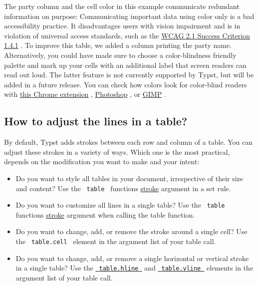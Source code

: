 The party column and the cell color in this example communicate
redundant information on purpose: Communicating important data using
color only is a bad accessibility practice. It disadvantages users with
vision impairment and is in violation of universal access standards,
such as the
\href{https://www.w3.org/WAI/WCAG21/Understanding/use-of-color.html}{WCAG
2.1 Success Criterion 1.4.1} . To improve this table, we added a column
printing the party name. Alternatively, you could have made sure to
choose a color-blindness friendly palette and mark up your cells with an
additional label that screen readers can read out loud. The latter
feature is not currently supported by Typst, but will be added in a
future release. You can check how colors look for color-blind readers
with
\href{https://chromewebstore.google.com/detail/colorblindly/floniaahmccleoclneebhhmnjgdfijgg}{this
Chrome extension} ,
\href{https://helpx.adobe.com/photoshop/using/proofing-colors.html}{Photoshop}
, or
\href{https://docs.gimp.org/2.10/en/gimp-display-filter-dialog.html}{GIMP}
.

\subsection{How to adjust the lines in a table?}\label{strokes}

By default, Typst adds strokes between each row and column of a table.
You can adjust these strokes in a variety of ways. Which one is the most
practical, depends on the modification you want to make and your intent:

\begin{itemize}
\tightlist
\item
  Do you want to style all tables in your document, irrespective of
  their size and content? Use the \texttt{\ table\ }
  function\textquotesingle s
  \href{/docs/reference/model/table/\#parameters-stroke}{stroke}
  argument in a set rule.
\item
  Do you want to customize all lines in a single table? Use the
  \texttt{\ table\ } function\textquotesingle s
  \href{/docs/reference/model/table/\#parameters-stroke}{stroke}
  argument when calling the table function.
\item
  Do you want to change, add, or remove the stroke around a single cell?
  Use the \texttt{\ table.cell\ } element in the argument list of your
  table call.
\item
  Do you want to change, add, or remove a single horizontal or vertical
  stroke in a single table? Use the
  \href{/docs/reference/model/table/\#definitions-hline}{\texttt{\ table.hline\ }}
  and
  \href{/docs/reference/model/table/\#definitions-vline}{\texttt{\ table.vline\ }}
  elements in the argument list of your table call.
\end{itemize}

